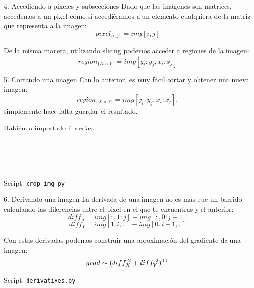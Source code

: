\documentclass[usenames,dvipsnames]{beamer}
\begin{document}
  \begin{frame}{4. Accediendo a pixeles y subsecciones}
    Dado que las imágenes son matrices, accedemos a un pixel como si accediéramos
    a un elemento cualquiera de la matriz que representa a la imagen:
    $$pixel_{\{i,j\}} = img[i,j]$$

    De la misma manera, utilizando slicing podemos acceder a regiones de la
    imagen:
    $$region_{\{X\times Y\}} = img[y_i:y_j, x_i:x_j]$$
  \end{frame}

  \begin{frame}{5. Cortando una imagen}
    Con lo anterior, es muy fácil cortar y obtener una nueva imagen:
    $$region_{\{X\times Y\}} = img[y_i:y_j, x_i:x_j],$$
    simplemente hace falta guardar el resultado.\\
    \vspace*{0.3cm}
    \begin{block}{Habiendo importado librerías...}
      \\
      \\
      \\
      \\
      \\
      \vspace*{0.5cm}
    \end{block}
    Script: \texttt{crop\_img.py}
  \end{frame}

  \begin{frame}{6. Derivando una imagen}
    La derivada de una imagen no es más que un barrido calculando las
    diferencias entre el pixel en el que te encuentras y el anterior:
    $$diff_X = img[:,1:j] - img[:,0:j-1]$$
    $$diff_Y = img[1:i,:] - img[0:i-1,:]$$

    Con estas derivadas podemos construir una aproximación del
    gradiente de una imagen:
    $$grad \sim (diff_X^{\hspace*{0.1cm}2} + diff_Y^{\hspace*{0.1cm}2})^{0.5}$$

    Script: \texttt{derivatives.py}
  \end{frame}
\end{document}
